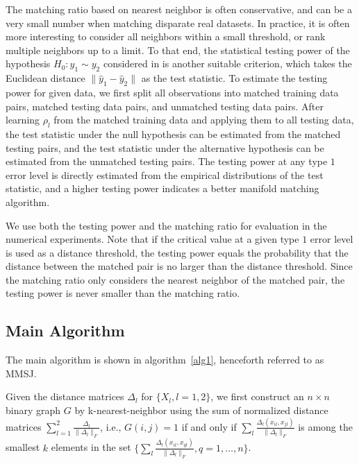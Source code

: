 \documentclass[times,twocolumn,final]{elsarticle}
\begin{document}
The matching ratio based on nearest neighbor is often conservative, and can be a very small number when matching disparate real datasets. In practice, it is often more interesting to consider all neighbors within a small threshold, or rank multiple neighbors up to a limit. To that end, the statistical testing power of the hypothesis $H_{0}: y_{1} \sim y_{2}$ considered in \citep{PriebeMarchette2012} is another suitable criterion, which takes the Euclidean distance $\|\hat{y}_{1}- \hat{y}_{2}\|$ as the test statistic. To estimate the testing power for given data, we first split all observations into matched training data pairs, matched testing data pairs, and unmatched testing data pairs. After learning $\rho_{l}$ from the matched training data and applying them to all testing data, the test statistic under the null hypothesis can be estimated from the matched testing pairs, and the test statistic under the alternative hypothesis can be estimated from the unmatched testing pairs. The testing power at any type $1$ error level is directly estimated from the empirical distributions of the test statistic, and a higher testing power indicates a better manifold matching algorithm. 

We use both the testing power and the matching ratio for evaluation in the numerical experiments. Note that if the critical value at a given type $1$ error level is used as a distance threshold, the testing power equals the probability that the distance between the matched pair is no larger than the distance threshold. Since the matching ratio only considers the nearest neighbor of the matched pair, the testing power is never smaller than the matching ratio.

\subsection{Main Algorithm}
\label{main1}
The main algorithm is shown in algorithm~\ref{alg1}, henceforth referred to as MMSJ. 

Given the distance matrices $\Delta_{l}$ for $\{X_{l}, l=1,2\}$, we first construct an $n \times n$ binary graph $G$ by k-nearest-neighbor using the sum of normalized distance matrices $\sum_{l=1}^{2} \frac{\Delta_{l}}{\|\Delta_{l}\|_{F}}$, i.e., $G(i,j)=1$ if and only if $\sum_{l} \frac{\Delta_{l}(x_{il},x_{jl})}{\|\Delta_{l}\|_{F}}$ is among the smallest $k$ elements in the set $\{ \sum_{l} \frac{\Delta_{l}(x_{il},x_{ql})} {\|\Delta_{l}\|_{F}}, q=1,\ldots,n \}$.
\end{document}
